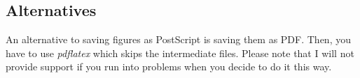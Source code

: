     \subsection{Alternatives}%
        An alternative to saving figures as PostScript is saving them as PDF. Then, you have to use \emph{pdflatex} which skips the intermediate files. Please note that I will not provide support if you run into problems when you decide to do it this way.
        
        